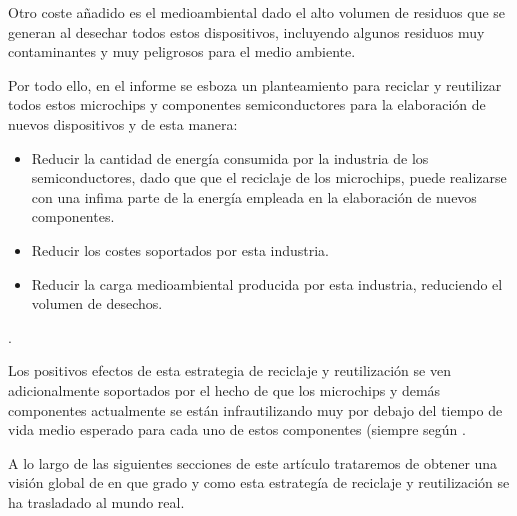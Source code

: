 Otro coste añadido es el medioambiental dado el alto volumen de residuos que se generan al desechar todos estos dispositivos, incluyendo algunos residuos muy contaminantes y muy peligrosos para el medio ambiente.

Por todo ello, en el informe \cite{reusing-silicon} se esboza un planteamiento para reciclar y reutilizar todos estos microchips y componentes semiconductores para la elaboración de nuevos dispositivos y de esta manera:

\begin{itemize}

\item{Reducir la cantidad de energía consumida por la industria de los semiconductores, dado que que el reciclaje de los microchips, puede realizarse con una infima parte de la energía empleada en la elaboración de nuevos componentes.}

\item{Reducir los costes soportados por esta industria.}

\item{Reducir la carga medioambiental producida por esta industria, reduciendo el volumen de desechos.}

\end{itemize}.

Los positivos efectos de esta estrategia de reciclaje y reutilización se ven adicionalmente soportados por el hecho de que los microchips y demás componentes actualmente se están infrautilizando muy por debajo del tiempo de vida medio esperado para cada uno de estos componentes (siempre según \cite{reusing-silicon}.

A lo largo de las siguientes secciones de este artículo trataremos de obtener una visión global de en que grado y como esta estrategía de reciclaje y reutilización se ha trasladado al mundo real.